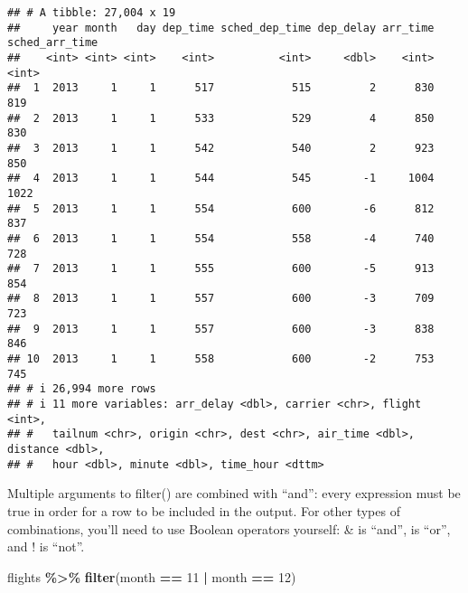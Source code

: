 \documentclass[
]{article}
\newenvironment{Shaded}{\begin{snugshade}}{\end{snugshade}}
\newcommand{\DecValTok}[1]{\textcolor[rgb]{0.00,0.00,0.81}{#1}}
\newcommand{\FunctionTok}[1]{\textcolor[rgb]{0.13,0.29,0.53}{\textbf{#1}}}
\newcommand{\NormalTok}[1]{#1}
\newcommand{\SpecialCharTok}[1]{\textcolor[rgb]{0.81,0.36,0.00}{\textbf{#1}}}
\begin{document}
\begin{verbatim}
## # A tibble: 27,004 x 19
##     year month   day dep_time sched_dep_time dep_delay arr_time sched_arr_time
##    <int> <int> <int>    <int>          <int>     <dbl>    <int>          <int>
##  1  2013     1     1      517            515         2      830            819
##  2  2013     1     1      533            529         4      850            830
##  3  2013     1     1      542            540         2      923            850
##  4  2013     1     1      544            545        -1     1004           1022
##  5  2013     1     1      554            600        -6      812            837
##  6  2013     1     1      554            558        -4      740            728
##  7  2013     1     1      555            600        -5      913            854
##  8  2013     1     1      557            600        -3      709            723
##  9  2013     1     1      557            600        -3      838            846
## 10  2013     1     1      558            600        -2      753            745
## # i 26,994 more rows
## # i 11 more variables: arr_delay <dbl>, carrier <chr>, flight <int>,
## #   tailnum <chr>, origin <chr>, dest <chr>, air_time <dbl>, distance <dbl>,
## #   hour <dbl>, minute <dbl>, time_hour <dttm>
\end{verbatim}

Multiple arguments to filter() are combined with ``and'': every
expression must be true in order for a row to be included in the output.
For other types of combinations, you'll need to use Boolean operators
yourself: \& is ``and'', \textbar{} is ``or'', and ! is ``not''.

\begin{Shaded}
\begin{Highlighting}[]
\NormalTok{flights }\SpecialCharTok{\%\textgreater{}\%} \FunctionTok{filter}\NormalTok{(month }\SpecialCharTok{==} \DecValTok{11} \SpecialCharTok{|}\NormalTok{ month }\SpecialCharTok{==} \DecValTok{12}\NormalTok{)}
\end{Highlighting}
\end{Shaded}
\end{document}
